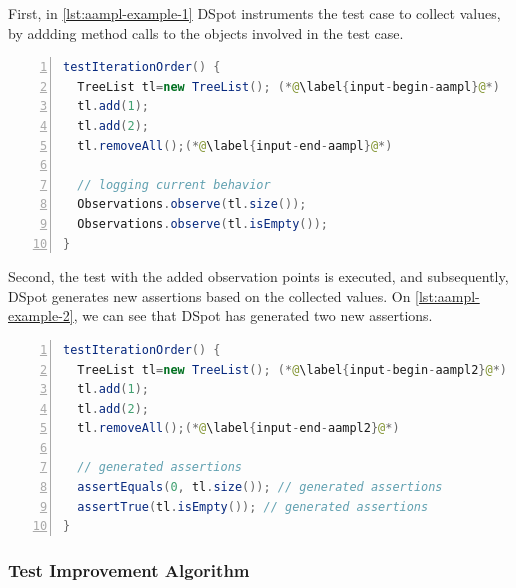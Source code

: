 \documentclass[table,xcdraw,smallextended]{svjour3}
\newcommand{\Aampl}{\emph{A-Amplification}\xspace}
\newcommand{\dspot}{DSpot\xspace}
\begin{document}
First, in \autoref{lst:aampl-example-1} \dspot instruments the test case to collect values, by addding method calls to the objects involved in the test case.

\begin{lstlisting}[caption={In \Aampl{}, the second step is to instrument and run the test to collect runtime values.},label=lst:aampl-example-1,float,language=java,numbers=left] 
testIterationOrder() {
  TreeList tl=new TreeList(); (*@\label{input-begin-aampl}@*)
  tl.add(1);
  tl.add(2);
  tl.removeAll();(*@\label{input-end-aampl}@*)

  // logging current behavior
  Observations.observe(tl.size()); 
  Observations.observe(tl.isEmpty()); 
}
\end{lstlisting}

Second, the test with the added observation points is executed, and subsequently, \dspot{} generates new assertions based on the collected values. On \autoref{lst:aampl-example-2}, we can see that \dspot has generated two new assertions.

\begin{lstlisting}[caption={In \Aampl{}, the last step is to generate the assertions based on the collected values.},label=lst:aampl-example-2,float,language=java,numbers=left] 
testIterationOrder() {
  TreeList tl=new TreeList(); (*@\label{input-begin-aampl2}@*)
  tl.add(1);
  tl.add(2);
  tl.removeAll();(*@\label{input-end-aampl2}@*)

  // generated assertions
  assertEquals(0, tl.size()); // generated assertions
  assertTrue(tl.isEmpty()); // generated assertions
}
\end{lstlisting}

\subsubsection{Test Improvement Algorithm}
\label{subsec:algo}

\begin{algorithm}[t]
\begin{algorithmic}[1]
        \ENDFOR
    \ENDFOR
\ENDFOR
{}
\end{algorithmic}
\caption{Main amplification loop of \dspot.}
\label{algo:dspot_main}
\end{algorithm}
\end{document}

